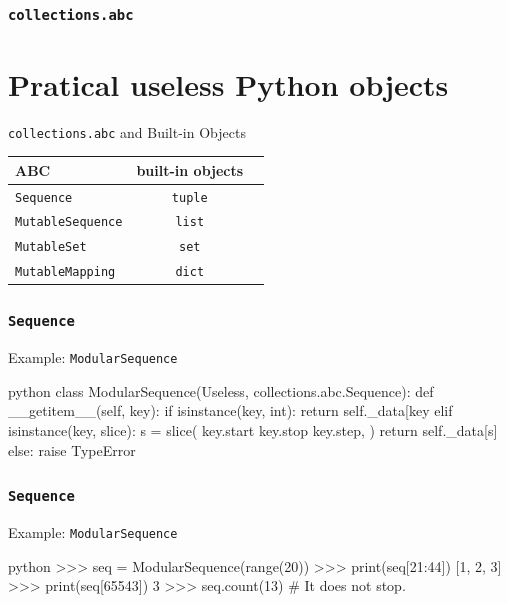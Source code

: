 \documentclass[aspectratio=169,dvipdfmx,12pt,notheorems]{beamer}
\theoremstyle{definition}
\begin{document}
\begin{frame}\frametitle{\texttt{collections.abc}}

\section{Pratical useless Python objects}

\begin{exampleblock}{\texttt{collections.abc} and Built-in Objects}
\begin{table}[h]
\centering
\begin{tabular}{lcr}
\hline
ABC  & built-in objects \\
\hline
\texttt{Sequence}  & \texttt{tuple} \\
\texttt{MutableSequence}  & \texttt{list} \\
\texttt{MutableSet}  &  \texttt{set} \\
\texttt{MutableMapping}  & \texttt{dict}  \\
\hline
\end{tabular}
\end{table}
\end{exampleblock}

\end{frame}

\begin{frame}[fragile,shrink=10]\frametitle{\texttt{Sequence}}

\begin{exampleblock}{Example: \texttt{ModularSequence}}
\begin{pygments}{python}
class ModularSequence(Useless, collections.abc.Sequence):
    def __getitem__(self, key):
        if isinstance(key, int):
            return self._data[key %
        elif isinstance(key, slice):
            s = slice(
                key.start %
                key.stop %
                key.step,
            )
            return self._data[s]
        else:
            raise TypeError
\end{pygments}
\end{exampleblock}

\end{frame}

\begin{frame}[fragile]\frametitle{\texttt{Sequence}}

\begin{exampleblock}{Example: \texttt{ModularSequence}}
\begin{pygments}{python}
>>> seq = ModularSequence(range(20))
>>> print(seq[21:44])
[1, 2, 3]
>>> print(seq[65543])
3
>>> seq.count(13) # It does not stop.
\end{pygments}
\end{exampleblock}

\end{frame}
\end{document}
